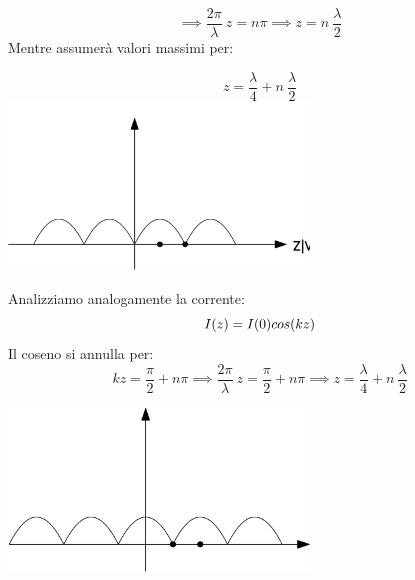 \begin{equation*}
    \implies \frac{2\pi}{\lambda} \ z = n \pi \implies z = n \ \frac{\lambda}{2}
\end{equation*}
Mentre assumerà valori massimi per:
\begin{center}
    \begin{equation*}
    z = \frac{\lambda}{4} + n \ \frac{\lambda}{2}
\end{equation*}
\includegraphics[width=0.6\textwidth]{Images/figure7.png}
\end{center}

Analizziamo analogamente la corrente:
\begin{equation*}
    I(z) = I(0) \\cos(kz)
\end{equation*}
Il coseno si annulla per:
\begin{equation*}
    kz = \frac{\pi}{2} + n\pi \implies \frac{2\pi}{\lambda} \ z =  \frac{\pi}{2} + n\pi \implies z = \frac{\lambda}{4} + n \ \frac{\lambda}{2}
\end{equation*}
\begin{center}
\includegraphics[width=0.6\textwidth]{Images/figure8.png}
\end{center}

